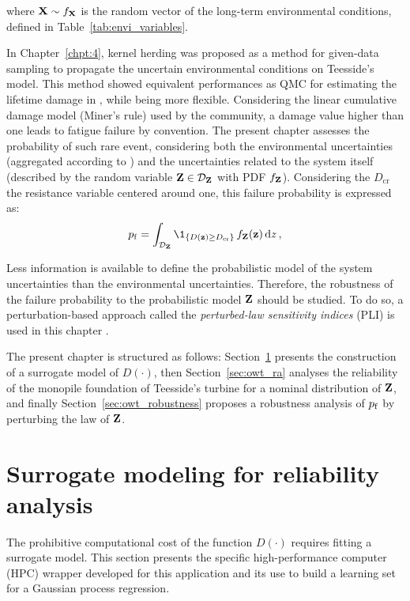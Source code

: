 where ${\bf X} \sim f_{\bf X}$ is the random vector of the long-term environmental conditions, defined in Table~\ref{tab:envi_variables}. 

In Chapter~\ref{chpt:4}, kernel herding was proposed as a method for given-data sampling to propagate the uncertain environmental conditions on Teesside's model. 
This method showed equivalent performances as QMC for estimating the lifetime damage in , while being more flexible. 
Considering the linear cumulative damage model (Miner's rule) used by the community, a damage value higher than one leads to fatigue failure by convention. 
The present chapter assesses the probability of such rare event, considering both the environmental uncertainties (aggregated according to ) and the uncertainties related to the system itself (described by the random variable ${\bf Z} \in \mathcal{D}_{\bf Z}$ with PDF $f_{\bf Z}$). 
Considering the $D_{\mathrm{cr}}$ the resistance variable centered around one, this failure probability is expressed as:
\begin{equation}
    \pf = \int_{\iD_\bZ} \1_{\{D(\bz) \geq D_{\mathrm{cr}}\}} \, f_\bZ(\bz) \, \dd z \,,
    \label{eq:owt_pf}
\end{equation}

Less information is available to define the probabilistic model of the system uncertainties than the environmental uncertainties. 
Therefore, the robustness of the failure probability to the probabilistic model ${\bf Z}$ should be studied. 
To do so, a perturbation-based approach called the \textit{perturbed-law sensitivity indices} (PLI) is used in this chapter \citep{lemaitre_2015_PLI}.   

The present chapter is structured as follows: 
Section~\ref{sec:owt_surrogate} presents the construction of a surrogate model of $D(\cdot)$,
then Section~\ref{sec:owt_ra} analyses the reliability of the monopile foundation of Teesside's turbine for a nominal distribution of ${\bf Z}$, 
and finally Section~\ref{sec:owt_robustness} proposes a robustness analysis of $p_\mathrm{f}$ by perturbing the law of ${\bf Z}$.

\section{Surrogate modeling for reliability analysis}\label{sec:owt_surrogate}
The prohibitive computational cost of the function $D(\cdot)$ requires fitting a surrogate model.  
This section presents the specific high-performance computer (HPC) wrapper developed for this application and its use to build a learning set for a Gaussian process regression. 

